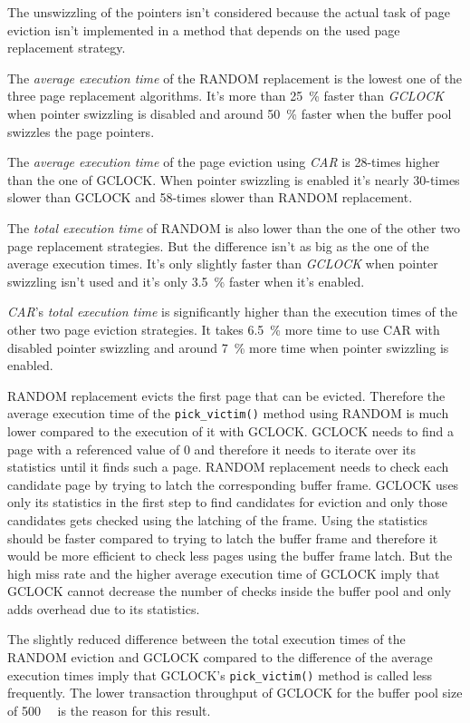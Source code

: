 	The unswizzling of the pointers isn't considered because the actual task of page eviction isn't implemented in a method that depends on the used page replacement strategy.
	
	The \emph{average execution time} of the RANDOM replacement is the lowest one of the three page replacement algorithms. It's more than \SI{25}{\percent} faster than \emph{GCLOCK} when pointer swizzling is disabled and around \SI{50}{\percent} faster when the buffer pool swizzles the page pointers.
	
	The \emph{average execution time} of the page eviction using \emph{CAR} is 28-times higher than the one of GCLOCK. When pointer swizzling is enabled it's nearly 30-times slower than GCLOCK and 58-times slower than RANDOM replacement.
	
	The \emph{total execution time} of RANDOM is also lower than the one of the other two page replacement strategies. But the difference isn't as big as the one of the average execution times. It's only slightly faster than \emph{GCLOCK} when pointer swizzling isn't used and it's only \SI{3.5}{\percent} faster when it's enabled.
	
	\emph{CAR}'s \emph{total execution time} is significantly higher than the execution times of the other two page eviction strategies. It takes \SI{6.5}{\percent} more time to use CAR with disabled pointer swizzling and around \SI{7}{\percent} more time when pointer swizzling is enabled.
	
	RANDOM replacement evicts the first page that can be evicted. Therefore the average execution time of the \lstinline{pick_victim()} method using RANDOM is much lower compared to the execution of it with GCLOCK. GCLOCK needs to find a page with a referenced value of \num{0} and therefore it needs to iterate over its statistics until it finds such a page. RANDOM replacement needs to check each candidate page by trying to latch the corresponding buffer frame. GCLOCK uses only its statistics in the first step to find candidates for eviction and only those candidates gets checked using the latching of the frame. Using the statistics should be faster compared to trying to latch the buffer frame and therefore it would be more efficient to check less pages using the buffer frame latch. But the high miss rate and the higher average execution time of GCLOCK imply that GCLOCK cannot decrease the number of checks inside the buffer pool and only adds overhead due to its statistics.
	
	The slightly reduced difference between the total execution times of the RANDOM eviction and GCLOCK compared to the difference of the average execution times imply that GCLOCK's \lstinline{pick_victim()} method is called less frequently. The lower transaction throughput of GCLOCK for the buffer pool size of \SI{500}{\mebi\byte} is the reason for this result.
	
